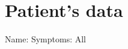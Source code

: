 \documentclass{article}%
\begin{document}
%
\normalsize%
\section{Patient's data}%
\label{sec:Patientsdata}%
Name: %
\newline%
Symptoms: %
\newline%
All

%
\end{document}
